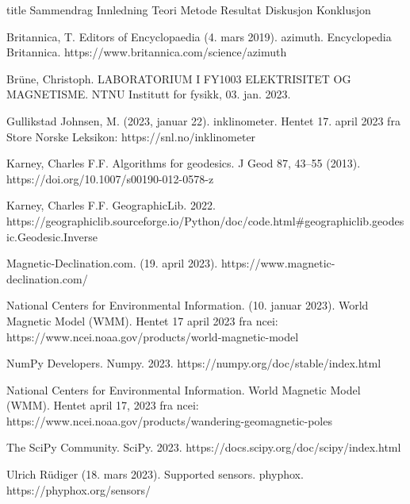 \documentclass[5p]{article}
\begin{document}
{title} %
{Sammendrag}
\pagebreak
{Innledning}
{Teori}
\pagebreak
{Metode}
{Resultat}
{Diskusjon}
{Konklusjon}

\begin{thebibliography}{5}
 Britannica, T. Editors of Encyclopaedia (4. mars 2019). azimuth. Encyclopedia Britannica. https://www.britannica.com/science/azimuth

Brüne, Christoph. LABORATORIUM I FY1003 ELEKTRISITET OG MAGNETISME. NTNU Institutt for fysikk, 03. jan. 2023.

Gullikstad Johnsen, M. (2023, januar 22). inklinometer. Hentet 17. april 2023 fra Store Norske Leksikon: https://snl.no/inklinometer

 Karney, Charles F.F. Algorithms for geodesics. J Geod 87, 43–55 (2013). https://doi.org/10.1007/s00190-012-0578-z

 Karney, Charles F.F. GeographicLib. 2022. \\
https://geographiclib.sourceforge.io/Python/doc/code.html\#geographiclib.geodesic.Geodesic.Inverse

 Magnetic-Declination.com. (19. april 2023). https://www.magnetic-declination.com/

National Centers for Environmental Information. (10. januar 2023). World Magnetic Model (WMM). Hentet 17 april 2023 fra ncei: https://www.ncei.noaa.gov/products/world-magnetic-model

 NumPy Developers. Numpy. 2023. https://numpy.org/doc/stable/index.html

National Centers for Environmental Information. World Magnetic Model (WMM). Hentet april 17, 
2023 fra ncei: https://www.ncei.noaa.gov/products/wandering-geomagnetic-poles

 The SciPy Community. SciPy. 2023. 
https://docs.scipy.org/doc/scipy/index.html

 Ulrich Rüdiger (18. mars 2023). Supported sensors. phyphox. 
https://phyphox.org/sensors/

\end{thebibliography}
\end{document}
